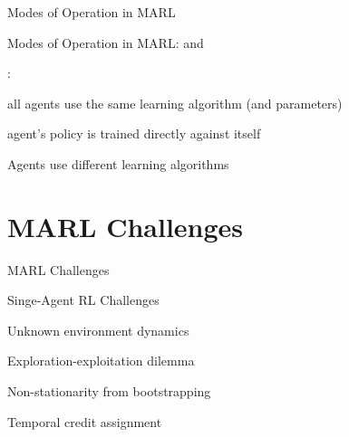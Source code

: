 \begin{frame}{Modes of Operation in MARL}

Modes of Operation in MARL:  and 

\vspace{10pt}

:
\blist
    \item {} all agents use the same learning algorithm (and parameters)
    \item {} agent's policy is trained directly against itself
\elist

\vspace{5pt}

\blist
    \item Agents use different learning algorithms
\elist
    
\end{frame}

\section{MARL Challenges}

\begin{frame}{MARL Challenges}

\small 

\bcol
		\begin{redtitlebox}{Singe-Agent RL Challenges}
		\blist
		    \item Unknown environment dynamics
		    \item Exploration-exploitation dilemma
		    \item Non-stationarity from bootstrapping
		    \item Temporal credit assignment
		\elist
		\end{redtitlebox}
		
\ecol    
\end{frame}

